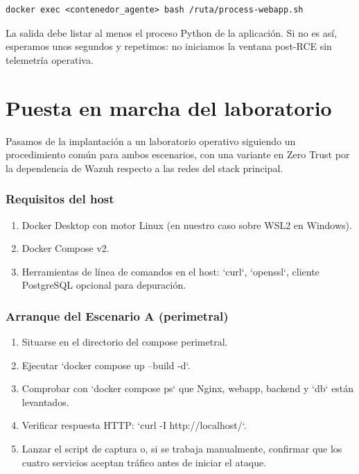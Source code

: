 \documentclass[11pt,spanish,listoffigures,listoftables]{tfgetsinf}
\begin{document}
        \begin{lstlisting}
docker exec <contenedor_agente> bash /ruta/process-webapp.sh
        \end{lstlisting}
        
        La salida debe listar al menos el proceso Python de la aplicación. Si no es así, esperamos unos segundos y repetimos: no iniciamos la ventana post-RCE sin telemetría operativa.

    \section{Puesta en marcha del laboratorio}
    
    Pasamos de la implantación a un laboratorio operativo siguiendo un procedimiento común para ambos escenarios, con una variante en Zero Trust por la dependencia de Wazuh respecto a las redes del stack principal.
    
    \subsubsection{Requisitos del host}
    \begin{enumerate}
        \item Docker Desktop con motor Linux (en nuestro caso sobre WSL2 en Windows).
        \item Docker Compose v2.
        \item Herramientas de línea de comandos en el host: `curl`, `openssl`, cliente PostgreSQL opcional para depuración.
    \end{enumerate}
    
    \subsubsection{Arranque del Escenario A (perimetral)}
    \begin{enumerate}
        \item Situarse en el directorio del compose perimetral.
        \item Ejecutar `docker compose up --build -d`.
        \item Comprobar con `docker compose ps` que Nginx, webapp, backend y `db` están levantados.
        \item Verificar respuesta HTTP: `curl -I http://localhost/`.
        \item Lanzar el script de captura o, si se trabaja manualmente, confirmar que los cuatro servicios aceptan tráfico antes de iniciar el ataque.
    \end{enumerate}
    
\end{document}
